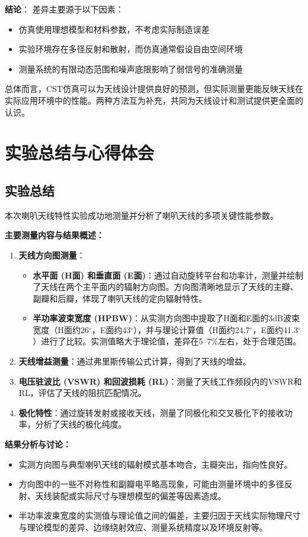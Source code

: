 \documentclass[12pt,a4paper,UTF8]{article}
\begin{document}
\textbf{结论}：
差异主要源于以下因素：
\begin{itemize}
    \item 仿真使用理想模型和材料参数，不考虑实际制造误差
    \item 实验环境存在多径反射和散射，而仿真通常假设自由空间环境
    \item 测量系统的有限动态范围和噪声底限影响了弱信号的准确测量
\end{itemize}

总体而言，CST仿真可以为天线设计提供良好的预测，但实际测量更能反映天线在实际应用环境中的性能。两种方法互为补充，共同为天线设计和测试提供更全面的认识。

\section{实验总结与心得体会}

\subsection{实验总结}

本次喇叭天线特性实验成功地测量并分析了喇叭天线的多项关键性能参数。

\textbf{主要测量内容与结果概述：}
\begin{enumerate}
    \item \textbf{天线方向图测量}：
    \begin{itemize}
        \item \textbf{水平面 (H面) 和垂直面 (E面)}：通过自动旋转平台和功率计，测量并绘制了天线在两个主平面内的辐射方向图。方向图清晰地显示了天线的主瓣、副瓣和后瓣，体现了喇叭天线的定向辐射特性。
        \item \textbf{半功率波束宽度 (HPBW)}：从实测方向图中提取了H面和E面的3dB波束宽度（H面约26$^{\circ}$，E面约43$^{\circ}$），并与理论计算值（H面约24.7$^{\circ}$，E面约41.3$^{\circ}$）进行了比较。实测值略大于理论值，差异在5--7\%左右，处于合理范围。
    \end{itemize}
    \item \textbf{天线增益测量}：通过弗里斯传输公式计算，得到了天线的增益。
    \item \textbf{电压驻波比 (VSWR) 和回波损耗 (RL)}：测量了天线工作频段内的VSWR和RL，评估了天线的阻抗匹配情况。
    \item \textbf{极化特性}：通过旋转发射或接收天线，测量了同极化和交叉极化下的接收功率，分析了天线的极化纯度。
\end{enumerate}

\textbf{结果分析与讨论：}
\begin{itemize}
    \item 实测方向图与典型喇叭天线的辐射模式基本吻合，主瓣突出，指向性良好。
    \item 方向图中的一些不对称性和副瓣电平略高现象，可能由测量环境中的多径反射、天线装配或实际尺寸与理想模型的偏差等因素造成。
    \item 半功率波束宽度的实测值与理论值之间的偏差，主要归因于天线实际物理尺寸与理论模型的差异、边缘绕射效应、测量系统精度以及环境反射等。

\end{itemize}
\end{document}
